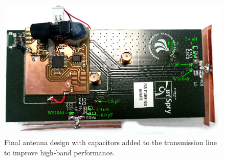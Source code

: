 \begin{figure}[htbp]
    \centering
    \includegraphics{img/tech_sol/monopole/highband/meas/final_tuner/lassedouble.pdf}
    \caption{Final antenna design with capacitors added to the transmission line to improve high-band performance.}
    \label{fig:final_lassedouble}
\end{figure}

